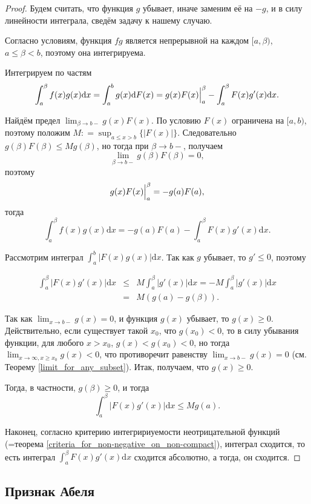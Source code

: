 \begin{proof}

Будем считать, что функция $g$ убывает, иначе заменим её на $-g$, и в силу линейности интеграла, сведём задачу к нашему случаю.

Согласно условиям, функция $fg$ является непрерывной на каждом $[a,\beta)$, $a \le \beta <b$, поэтому она интегрируема. 

Интегрируем по частям
\[
 \int_a^\beta f(x)g(x) \mathrm{d}x = \int_a^b g(x) \mathrm{d}F(x) = \Bigl. g(x) F(x) \Bigr|_a^\beta - \int_a^\beta F(x) g'(x) \mathrm{d}x.
\]

Найдём предел $\lim_{\beta \to b-}g(x) F(x)$. По условию $F(x)$ ограничена на $[a,b)$, поэтому положим $M: = \sup_{a \le x >b}\{|F(x)|\}$. Следовательно $g(\beta)F(\beta) \le M g(\beta)$, но тогда при $\beta \to b-$, получаем
\[
 \lim_{\beta \to b-} g(\beta) F(\beta) = 0, 
\]
поэтому
\[
\Bigl. g(x) F(x) \Bigr|_a^\beta  = - g(a)F(a),
\]
тогда
\[
 \int_a^\beta f(x)g(x) \mathrm{d}x  =- g(a) F(a) - \int_a^\beta F(x) g'(x) \mathrm{d}x.
\]

Рассмотрим интеграл $\int_a^b |F(x)g(x)| \mathrm{d}x$. Так как $g$ убывает, то $g'\le 0$, поэтому

\begin{eqnarray*}
 \int_a^\beta| F(x) g'(x) |\mathrm{d}x &\le &  M \int_a^\beta |g'(x)| \mathrm{d}x = - M \int_a^\beta |g'(x)| \mathrm{d}x\\
 &=& M(g(a)-g(\beta)).
\end{eqnarray*}

Так как $\lim_{x \to b-} g(x) = 0$, и функция $g(x)$ убывает, то $g(x) \ge 0$. Действительно, если существует такой $x_0$, что $g(x_0) <0$, то в силу убывания функции, для любого $x>x_0$, $g(x) <g(x_0) <0$, но тогда $\lim_{x \to \infty, x\ge x_0} g(x) <0$, что противоречит равенству $\lim_{x \to b-} g(x) = 0$ (см. Теорему \ref{limit_for_any_subset}). Итак, получаем, что $g(x)\ge 0$.

Тогда, в частности, $g(\beta) \ge 0$, и тогда
\[
 \int_a^\beta| F(x) g'(x) |\mathrm{d}x \le M g(a).
\]

Наконец, согласно критерию интегририуемости неотрицательной функций (=теорема \ref{criteria_for_non-negative_on_non-compact}), интеграл сходится, то есть интеграл $\int_a^\beta F(x) g'(x) \mathrm{d}x$ сходится абсолютно, а тогда, он сходится.
\end{proof}


\subsection{Признак Абеля}


